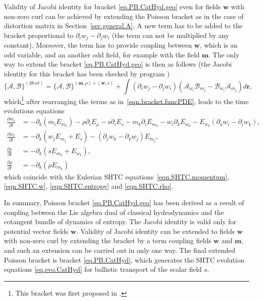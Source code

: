 \documentclass[twoside]{article}
\newcommand{\rr}{{\boldsymbol{r}}}
\newcommand{\ww}{{\boldsymbol{w}}}
\newcommand{\mm}{{\boldsymbol{m}}}
\newcommand{\ted}{E} %
\newcommand{\AF}{\mathscr{A}}
\newcommand{\BF}{\mathscr{B}}
\newcommand{\pd}{\partial}
\begin{document}
Validity of Jacobi identity for bracket \eqref{eq.PB.CatHyd.geo} even for 
fields $\ww$ with non-zero curl can be achieved by extending the Poisson 
bracket as in the case of distortion matrix in Section~\ref{sec.general.A}. A 
new term has to be added to the 
bracket proportional to $\pd_i w_j -\pd_j w_i$ (the term can not be multiplied 
by any constant). Moreover, the term has to 
provide coupling between $\ww$, which is an odd variable, and an another odd 
field, for example with the field $\mm$. The only way to extend the bracket 
\eqref{eq.PB.CatHyd.geo} is then as follows (the Jacobi identity for this 
bracket 
has been checked by program 
\cite{kroeger2010})
\begin{equation}\label{eq.PB.CatHyd}
\{\AF,\BF\}^{(Heat)} = \{\AF,\BF\}^{(\mm,\rho) \times 
(\ww,s)} + \int \left(\pd_i w_j -\pd_j 
w_i\right)\left(\AF_{w_i}\BF_{m_j}-\BF_{w_i}\AF_{m_j}\right) d\rr,
\end{equation}
which\footnote{This bracket was first proposed in \cite{Ottinger1998}.} after rearranging the terms as in~\eqref{eqn.bracket.funcPDE}, leads to 
the time evolutions equations
\begin{subequations}\label{eq.evo.CatHyd}
\begin{align}
\frac{\pd m_i}{\pd t} &= -\pd_k(m_i \ted_{m_k}) - \rho\pd_i 
\ted_\rho - s\pd_i \ted_s - m_k \pd_i \ted_{m_k} - w_i \pd_k \ted_{w_k} - 
\ted_{w_k}(\pd_a w_i 
- \pd_i w_k),\\[1mm]
\frac{\pd w_k}{\pd t} &= -\pd_k(w_j  \ted_{m_j} + \ted_s) - (\pd_j w_k - \pd_k 
w_j) \ted_{m_j},\label{eq.evo.CatHyd.w}\\[1mm]
\frac{\pd s}{\pd t} &= -\pd_k \left(s \ted_{m_k} + \ted_{w_k}\right),\\[1mm]
\frac{\pd \rho}{\pd t} &= -\pd_k (\rho \ted_{m_k})
\end{align}
\end{subequations}
which coincide with the Eulerian SHTC equations~\eqref{eqn.SHTC.momentum}, 
\eqref{eqn.SHTC.w}, \eqref{eqn.SHTC.entropy} and \eqref{eqn.SHTC.rho}.
 

In summary, Poisson bracket \eqref{eq.PB.CatHyd.geo} has been derived as a 
result of coupling between the Lie algebra dual of classical hydrodynamics and 
the cotangent bundle of dynamics of entropy. The Jacobi identity is valid only 
for potential vector fields $\ww$. Validity of Jacobi identity can be extended 
to fields $\ww$ with non-zero curl by extending the bracket by a term coupling 
fields $\ww$ and $\mm$, and such an extension can be carried out in only one 
way. The final extended Poisson bracket is bracket \eqref{eq.PB.CatHyd}, which 
generates the SHTC evolution equations \eqref{eq.evo.CatHyd} for ballistic 
transport of the scalar 
field $ s $.
\end{document}
